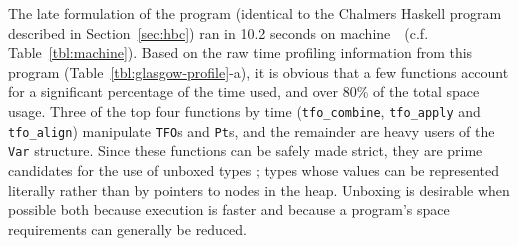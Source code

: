 The late formulation of the program (identical to the Chalmers Haskell
program described in Section~\ref{sec:hbc}) ran in 10.2 seconds on
machine~\sysglasgow~(c.f.  Table~\ref{tbl:machine}). Based on the raw
time profiling information from this program
(Table~\ref{tbl:glasgow-profile}-a), it is obvious that a few
functions account for a significant percentage of the time used, and
over 80\% of the total space usage. Three of the top four functions by
time (\verb=tfo_combine=, \verb=tfo_apply= and
\verb=tfo_align=) manipulate \verb=TFO=s and \verb=Pt=s, and the
remainder are heavy users of the \verb=Var= structure. Since these
functions can be safely made strict, they are prime candidates for the
use of unboxed types \cite{Pey91b}; types whose values can be
represented literally rather than by pointers to nodes in the heap.
Unboxing is desirable when possible both because execution is faster
and because a program's space requirements can generally be reduced.

